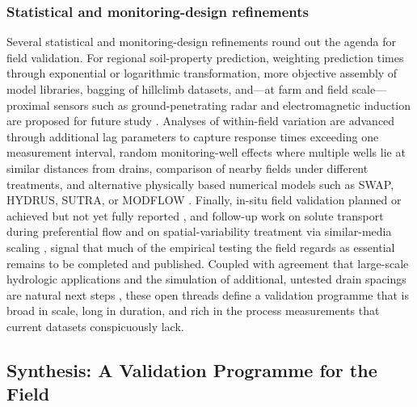 \subsubsection{Statistical and monitoring-design refinements}

Several statistical and monitoring-design refinements round out the agenda for field validation. For regional soil-property prediction, weighting prediction times through exponential or logarithmic transformation, more objective assembly of model libraries, bagging of hillclimb datasets, and---at farm and field scale---proximal sensors such as ground-penetrating radar and electromagnetic induction are proposed for future study \parencite{Moller2018}. Analyses of within-field variation are advanced through additional lag parameters to capture response times exceeding one measurement interval, random monitoring-well effects where multiple wells lie at similar distances from drains, comparison of nearby fields under different treatments, and alternative physically based numerical models such as SWAP, HYDRUS, SUTRA, or MODFLOW \parencite{vandeCraats2025}. Finally, in-situ field validation planned or achieved but not yet fully reported \parencite{Hartani2001}, and follow-up work on solute transport during preferential flow and on spatial-variability treatment via similar-media scaling \parencite{Mohanty1997}, signal that much of the empirical testing the field regards as essential remains to be completed and published. Coupled with agreement that large-scale hydrologic applications and the simulation of additional, untested drain spacings are natural next steps \parencite{Talukolaee2022}, these open threads define a validation programme that is broad in scale, long in duration, and rich in the process measurements that current datasets conspicuously lack.

\subsection{Synthesis: A Validation Programme for the Field}

